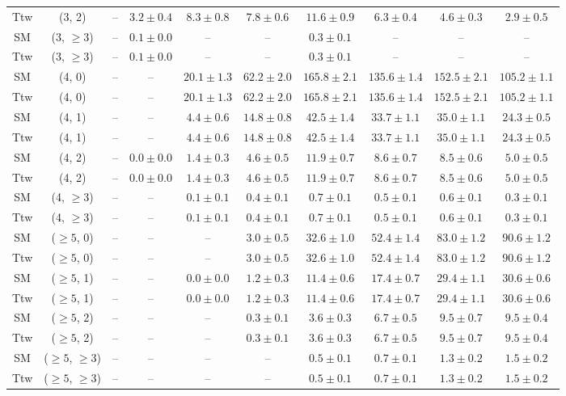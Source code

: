 \begin{table}[h!]
{\begin{tabular}{cccccccccc}
	Ttw & (3, 2) & -- & $3.2\pm 0.4$ & $8.3\pm 0.8$ & $7.8\pm 0.6$ & $11.6\pm 0.9$ & $6.3\pm 0.4$ & $4.6\pm 0.3$ & $2.9\pm 0.5$ \\[0.5ex] 
	SM & (3, $\ge3$) & -- & $0.1\pm 0.0$ & -- & -- & $0.3\pm 0.1$ & -- & -- & -- \\[0.5ex] 
	Ttw & (3, $\ge3$) & -- & $0.1\pm 0.0$ & -- & -- & $0.3\pm 0.1$ & -- & -- & -- \\[0.5ex] 
	SM & (4, 0) & -- & -- & $20.1\pm 1.3$ & $62.2\pm 2.0$ & $165.8\pm 2.1$ & $135.6\pm 1.4$ & $152.5\pm 2.1$ & $105.2\pm 1.1$ \\[0.5ex] 
	Ttw & (4, 0) & -- & -- & $20.1\pm 1.3$ & $62.2\pm 2.0$ & $165.8\pm 2.1$ & $135.6\pm 1.4$ & $152.5\pm 2.1$ & $105.2\pm 1.1$ \\[0.5ex] 
	SM & (4, 1) & -- & -- & $4.4\pm 0.6$ & $14.8\pm 0.8$ & $42.5\pm 1.4$ & $33.7\pm 1.1$ & $35.0\pm 1.1$ & $24.3\pm 0.5$ \\[0.5ex] 
	Ttw & (4, 1) & -- & -- & $4.4\pm 0.6$ & $14.8\pm 0.8$ & $42.5\pm 1.4$ & $33.7\pm 1.1$ & $35.0\pm 1.1$ & $24.3\pm 0.5$ \\[0.5ex] 
	SM & (4, 2) & -- & $0.0\pm 0.0$ & $1.4\pm 0.3$ & $4.6\pm 0.5$ & $11.9\pm 0.7$ & $8.6\pm 0.7$ & $8.5\pm 0.6$ & $5.0\pm 0.5$ \\[0.5ex] 
	Ttw & (4, 2) & -- & $0.0\pm 0.0$ & $1.4\pm 0.3$ & $4.6\pm 0.5$ & $11.9\pm 0.7$ & $8.6\pm 0.7$ & $8.5\pm 0.6$ & $5.0\pm 0.5$ \\[0.5ex] 
	SM & (4, $\ge3$) & -- & -- & $0.1\pm 0.1$ & $0.4\pm 0.1$ & $0.7\pm 0.1$ & $0.5\pm 0.1$ & $0.6\pm 0.1$ & $0.3\pm 0.1$ \\[0.5ex] 
	Ttw & (4, $\ge3$) & -- & -- & $0.1\pm 0.1$ & $0.4\pm 0.1$ & $0.7\pm 0.1$ & $0.5\pm 0.1$ & $0.6\pm 0.1$ & $0.3\pm 0.1$ \\[0.5ex] 
	SM & ($\ge5$, 0) & -- & -- & -- & $3.0\pm 0.5$ & $32.6\pm 1.0$ & $52.4\pm 1.4$ & $83.0\pm 1.2$ & $90.6\pm 1.2$ \\[0.5ex] 
	Ttw & ($\ge5$, 0) & -- & -- & -- & $3.0\pm 0.5$ & $32.6\pm 1.0$ & $52.4\pm 1.4$ & $83.0\pm 1.2$ & $90.6\pm 1.2$ \\[0.5ex] 
	SM & ($\ge5$, 1) & -- & -- & $0.0\pm 0.0$ & $1.2\pm 0.3$ & $11.4\pm 0.6$ & $17.4\pm 0.7$ & $29.4\pm 1.1$ & $30.6\pm 0.6$ \\[0.5ex] 
	Ttw & ($\ge5$, 1) & -- & -- & $0.0\pm 0.0$ & $1.2\pm 0.3$ & $11.4\pm 0.6$ & $17.4\pm 0.7$ & $29.4\pm 1.1$ & $30.6\pm 0.6$ \\[0.5ex] 
	SM & ($\ge5$, 2) & -- & -- & -- & $0.3\pm 0.1$ & $3.6\pm 0.3$ & $6.7\pm 0.5$ & $9.5\pm 0.7$ & $9.5\pm 0.4$ \\[0.5ex] 
	Ttw & ($\ge5$, 2) & -- & -- & -- & $0.3\pm 0.1$ & $3.6\pm 0.3$ & $6.7\pm 0.5$ & $9.5\pm 0.7$ & $9.5\pm 0.4$ \\[0.5ex] 
	SM & ($\ge5$, $\ge3$) & -- & -- & -- & -- & $0.5\pm 0.1$ & $0.7\pm 0.1$ & $1.3\pm 0.2$ & $1.5\pm 0.2$ \\[0.5ex] 
	Ttw & ($\ge5$, $\ge3$) & -- & -- & -- & -- & $0.5\pm 0.1$ & $0.7\pm 0.1$ & $1.3\pm 0.2$ & $1.5\pm 0.2$ \\[0.5ex] 
	\hline
	\hline
\end{tabular}}
\end{table}
